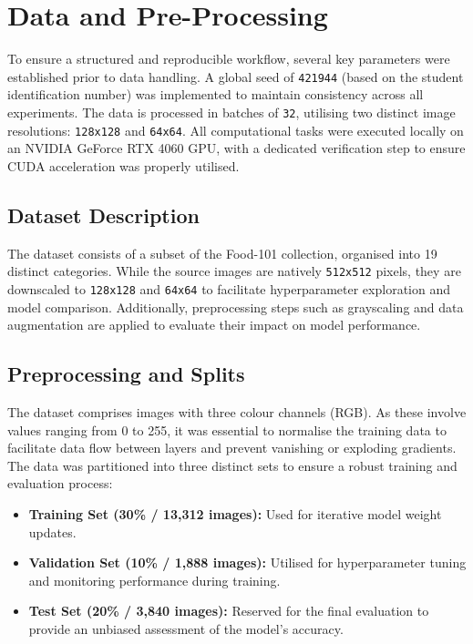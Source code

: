 \documentclass[a4paper,11pt]{article}
\begin{document}
\section{Data and Pre-Processing}
To ensure a structured and reproducible workflow, several key parameters were established prior to data handling. A global seed of \texttt{421944} (based on the student identification number) was implemented to maintain consistency across all experiments. The data is processed in batches of \texttt{32}, utilising two distinct image resolutions: \texttt{128x128} and \texttt{64x64}. All computational tasks were executed locally on an NVIDIA GeForce RTX 4060 GPU, with a dedicated verification step to ensure CUDA acceleration was properly utilised.

\subsection{Dataset Description}
The dataset consists of a subset of the Food-101 collection, organised into 19 distinct categories. While the source images are natively \texttt{512x512} pixels, they are downscaled to \texttt{128x128} and \texttt{64x64} to facilitate hyperparameter exploration and model comparison. Additionally, preprocessing steps such as grayscaling and data augmentation are applied to evaluate their impact on model performance.

\subsection{Preprocessing and Splits}
The dataset comprises images with three colour channels (RGB). As these involve values ranging from 0 to 255, it was essential to normalise the training data to facilitate data flow between layers and prevent vanishing or exploding gradients. The data was partitioned into three distinct sets to ensure a robust training and evaluation process:

\begin{itemize}
  \item \textbf{Training Set (30\% / 13,312 images):} Used for iterative model weight updates.
  \item \textbf{Validation Set (10\% / 1,888 images):} Utilised for hyperparameter tuning and monitoring performance during training.
  \item \textbf{Test Set (20\% / 3,840 images):} Reserved for the final evaluation to provide an unbiased assessment of the model's accuracy.
\end{itemize}
\end{document}
